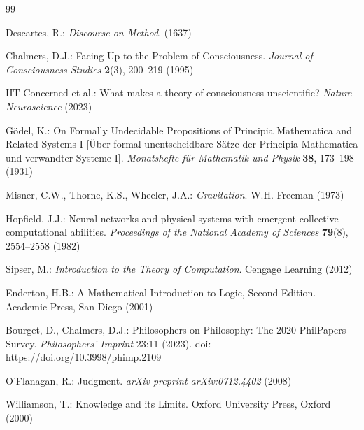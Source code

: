 \documentclass[runningheads]{llncs}
\begin{document}
\begin{thebibliography}{99}
	
Descartes, R.: \textit{Discourse on Method}. (1637)

Chalmers, D.J.: Facing Up to the Problem of Consciousness. \textit{Journal of Consciousness Studies} \textbf{2}(3), 200--219 (1995)

IIT-Concerned et al.: What makes a theory of consciousness unscientific? \textit{Nature Neuroscience} (2023)

Gödel, K.: On Formally Undecidable Propositions of Principia Mathematica and Related Systems I [Über formal unentscheidbare Sätze der Principia Mathematica und verwandter Systeme I]. \textit{Monatshefte für Mathematik und Physik} \textbf{38}, 173--198 (1931)

Misner, C.W., Thorne, K.S., Wheeler, J.A.: \textit{Gravitation}. W.H. Freeman (1973)
\begin{center}
	
\end{center}
Hopfield, J.J.: Neural networks and physical systems with emergent collective computational abilities. \textit{Proceedings of the National Academy of Sciences} \textbf{79}(8), 2554--2558 (1982)

Sipser, M.: \textit{Introduction to the Theory of Computation}. Cengage Learning (2012)

Enderton, H.B.: A Mathematical Introduction to Logic, Second Edition. Academic Press, San Diego (2001)

Bourget, D., Chalmers, D.J.: Philosophers on Philosophy: The 2020 PhilPapers Survey. \textit{Philosophers' Imprint} 23:11 (2023). doi: https://doi.org/10.3998/phimp.2109

O'Flanagan, R.: Judgment. \textit{arXiv preprint arXiv:0712.4402} (2008)

Williamson, T.: Knowledge and its Limits. Oxford University Press, Oxford (2000)
	
\end{thebibliography}
\end{document}
